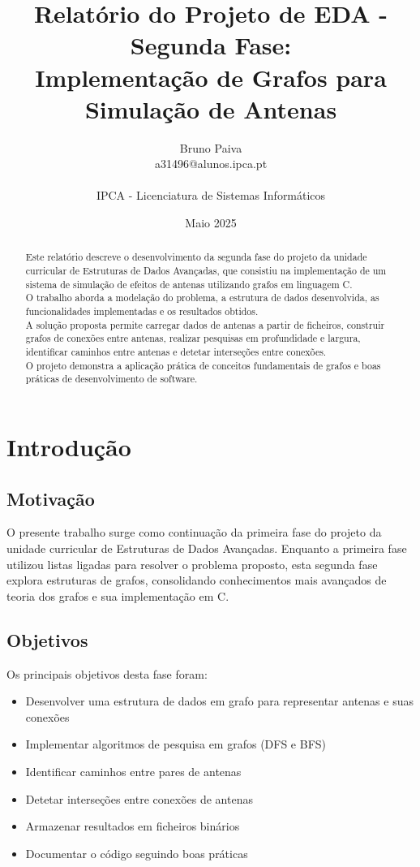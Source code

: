 \documentclass[a4paper, 12pt]{report}
\title{Relatório do Projeto de EDA - Segunda Fase: \\ Implementação de Grafos para Simulação de Antenas}
\author{Bruno Paiva \\ a31496@alunos.ipca.pt \\ \\ IPCA - Licenciatura de Sistemas Informáticos}
\date{Maio 2025}
\begin{document}
\maketitle

\begin{abstract}
Este relatório descreve o desenvolvimento da segunda fase do projeto da unidade curricular de Estruturas de Dados Avançadas, que consistiu na implementação de um sistema de simulação de efeitos de antenas utilizando grafos em linguagem C. 
\\O trabalho aborda a modelação do problema, a estrutura de dados desenvolvida, as funcionalidades implementadas e os resultados obtidos. 
\\A solução proposta permite carregar dados de antenas a partir de ficheiros, construir grafos de conexões entre antenas, realizar pesquisas em profundidade e largura, identificar caminhos entre antenas e detetar interseções entre conexões. 
\\O projeto demonstra a aplicação prática de conceitos fundamentais de grafos e boas práticas de desenvolvimento de software.
\end{abstract}

\tableofcontents

\chapter{Introdução}
\section{Motivação}
O presente trabalho surge como continuação da primeira fase do projeto da unidade curricular de Estruturas de Dados Avançadas. Enquanto a primeira fase utilizou listas ligadas para resolver o problema proposto, esta segunda fase explora estruturas de grafos, consolidando conhecimentos mais avançados de teoria dos grafos e sua implementação em C.

\section{Objetivos}
Os principais objetivos desta fase foram:
\begin{itemize}
\item Desenvolver uma estrutura de dados em grafo para representar antenas e suas conexões
\item Implementar algoritmos de pesquisa em grafos (DFS e BFS)
\item Identificar caminhos entre pares de antenas
\item Detetar interseções entre conexões de antenas
\item Armazenar resultados em ficheiros binários
\item Documentar o código seguindo boas práticas
\end{itemize}
\end{document}
